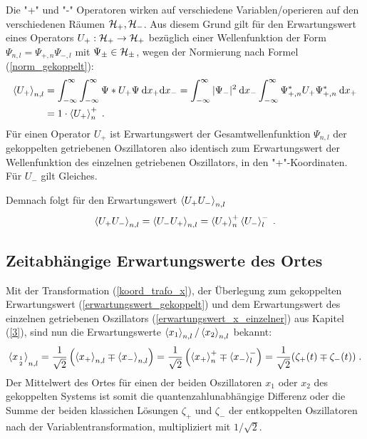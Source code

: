   Die "+" und "-" Operatoren wirken auf verschiedene Variablen/operieren auf den verschiedenen Räumen $\cal H_+,\cal H_-$.
  Aus diesem Grund gilt für den Erwartungswert eines Operators $U_+:\cal H_+ \rightarrow \cal H_+$ bezüglich einer Wellenfunktion der Form $\Psi_{n,l}=\Psi_{+,n}\Psi_{-,l}$ mit $\Psi_\pm \in \cal H_\pm$, wegen der Normierung nach Formel (\ref{norm_gekoppelt}):
  \begin{align}
    \braket{U_+}_{n,l} &= \int_{-\infty}^{\infty}\int_{-\infty}^{\infty} \Psi*U_+\Psi \: \text dx_+ \text dx_-
    = \int_{-\infty}^{\infty} |\Psi_-|^2 \: \text dx_- \int_{-\infty}^{\infty} \Psi_{+,n}^*U_+\Psi_{+,n}^* \: \text dx_+ \notag\\
    &= 1 \cdot \braket{U_+}_n^+ \; .
    \label{erwartungswert_gekoppelt}
  \end{align}
  Für einen Operator $U_+$ ist Erwartungswert der Gesamtwellenfunktion $\Psi_{n,l}$ der gekoppelten getriebenen Oszillatoren also identisch zum Erwartungswert der Wellenfunktion des einzelnen getriebenen Oszillators, in den "+"-Koordinaten.
  Für $U_-$ gilt Gleiches.

  Demnach folgt für den Erwartungswert $\braket{U_+U_-}_{n,l}$
  \begin{equation}
    \braket{U_+U_-}_{n,l}=\braket{U_-U_+}_{n,l} = \braket{U_+}_n^+\braket{U_-}_l^- \; .
    \label{erwartungswert_gekoppelt_produkt}
  \end{equation}


  \subsection{Zeitabhängige Erwartungswerte des Ortes}
    Mit der Transformation (\ref{koord_trafo_x}), der Überlegung zum gekoppelten Erwartungswert (\ref{erwartungswert_gekoppelt}) und dem Erwartungswert des einzelnen getriebenen Oszillators (\ref{erwartungswert_x_einzelner}) aus Kapitel (\ref{3}), sind nun die Erwartungswerte
    $\braket{x_1}_{n,l}/\braket{x_2}_{n,l}$ bekannt:
    \begin{align}
      \braket{x_{1 \atop 2}}_{n,l}=\frac{1}{\sqrt{2}}\left(\braket{x_+}_{n,l}\mp\braket{x_-}_{n,l}\right)
      =\frac{1}{\sqrt{2}}\left(\braket{x_+}_n^+\mp\braket{x_-}_l^-\right)
      =\frac{1}{\sqrt{2}}(\zeta_+(t)\mp\zeta_-(t)) \; .
    \end{align}
    Der Mittelwert des Ortes für einen der beiden Oszillatoren $x_1$ oder $x_2$ des gekoppelten Systems ist somit die quantenzahlunabhängige Differenz oder die Summe der beiden klassichen Lösungen $\zeta_+$ und $\zeta_-$ der entkoppelten Oszillatoren nach der Variablentransformation, multipliziert mit $1/\sqrt 2$.

